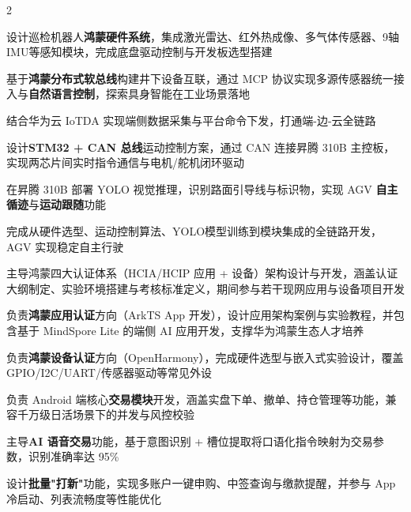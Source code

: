 \documentclass[]{deedy-resume-openfont}
\begin{document}
\begin{paracol}{2}
\begin{tightemize}
    \item 设计巡检机器人\textbf{鸿蒙硬件系统}，集成激光雷达、红外热成像、多气体传感器、9轴IMU等感知模块，完成底盘驱动控制与开发板选型搭建
    \item 基于\textbf{鸿蒙分布式软总线}构建井下设备互联，通过 MCP 协议实现多源传感器统一接入与\textbf{自然语言控制}，探索具身智能在工业场景落地
    \item 结合华为云 IoTDA 实现端侧数据采集与平台命令下发，打通端-边-云全链路
\end{tightemize}
\sectionsep

\begin{tightemize}
    \item 设计\textbf{STM32 + CAN 总线}运动控制方案，通过 CAN 连接昇腾 310B 主控板，实现两芯片间实时指令通信与电机/舵机闭环驱动
    \item 在昇腾 310B 部署 YOLO 视觉推理，识别路面引导线与标识物，实现 AGV \textbf{自主循迹}与\textbf{运动跟随}功能
    \item 完成从硬件选型、运动控制算法、YOLO模型训练到模块集成的全链路开发，AGV 实现稳定自主行驶
\end{tightemize}
\sectionsep

\begin{tightemize}
    \item 主导鸿蒙四大认证体系（HCIA/HCIP 应用 + 设备）架构设计与开发，涵盖认证大纲制定、实验环境搭建与考核标准定义，期间参与若干现网应用与设备项目开发
    \item 负责\textbf{鸿蒙应用认证}方向（ArkTS App 开发），设计应用架构案例与实验教程，并包含基于 MindSpore Lite 的端侧 AI 应用开发，支撑华为鸿蒙生态人才培养
    \item 负责\textbf{鸿蒙设备认证}方向（OpenHarmony），完成硬件选型与嵌入式实验设计，覆盖 GPIO/I2C/UART/传感器驱动等常见外设
\end{tightemize}
\sectionsep

\begin{tightemize}
    \item 负责 Android 端核心\textbf{交易模块}开发，涵盖实盘下单、撤单、持仓管理等功能，兼容千万级日活场景下的并发与风控校验
    \item 主导\textbf{AI 语音交易}功能，基于意图识别 + 槽位提取将口语化指令映射为交易参数，识别准确率达 95\%
    \item 设计\textbf{批量"打新"}功能，实现多账户一键申购、中签查询与缴款提醒，并参与 App 冷启动、列表流畅度等性能优化
\end{tightemize}
\sectionsep


\end{paracol}
\end{document}
